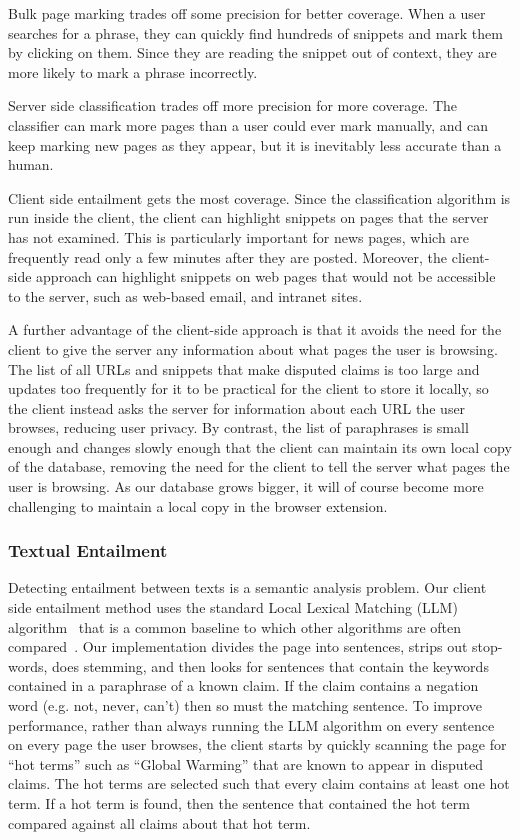 \documentclass{www2010-submission}
\begin{document}
Bulk page marking trades off some precision for better coverage. When a user searches for a phrase, they can quickly find hundreds of snippets and mark them by clicking on them. Since they are reading the snippet out of context, they are more likely to mark a phrase incorrectly. 

Server side classification trades off more precision for more coverage. The classifier can mark more pages than a user could ever mark manually, and can keep marking new pages as they appear, but it is inevitably less accurate than a human.

Client side entailment gets the most coverage. Since the classification algorithm is run inside the client, the client can highlight snippets on pages that the server has not examined. This is particularly important for news pages, which are frequently read only a few minutes after they are posted. Moreover, the client-side approach can highlight snippets on web pages that would not be accessible to the server, such as web-based email, and intranet sites. 

A further advantage of the client-side approach is that it avoids the need for the client to give the server any information about what pages the user is browsing. The list of all URLs and snippets that make disputed claims is too large and updates too frequently for it to be practical for the client to store it locally, so the client instead asks the server for information about each URL the user browses, reducing user privacy. By contrast, the list of paraphrases is small enough and changes slowly enough that the client can maintain its own local copy of the database, removing the need for the client to tell the server what pages the user is browsing. As our database grows bigger, it will of course become more challenging to maintain a local copy in the browser extension.

\subsubsection{Textual Entailment}

Detecting entailment between texts is a semantic analysis problem. Our client side entailment method uses the standard Local Lexical Matching (LLM) algorithm~\cite{Jijkoun2006} that is a common baseline to which other algorithms are often compared~\cite{Braz}. Our implementation divides the page into sentences, strips out stop-words, does stemming, and then looks for sentences that contain the keywords contained in a paraphrase of a known claim. If the claim contains a negation word (e.g. not, never, can't) then so must the matching sentence. To improve performance, rather than always running the LLM algorithm on every sentence on every page the user browses, the client starts by quickly scanning the page for ``hot terms'' such as ``Global Warming'' that are known to appear in disputed claims. The hot terms are selected such that every claim contains at least one hot term. If a hot term is found, then the sentence that contained the hot term compared against all claims about that hot term.
\end{document}

